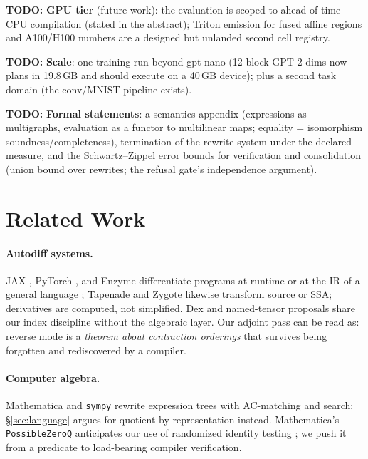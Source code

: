 \documentclass[sigplan,10pt,review]{acmart}
\newcommand{\todopaper}[1]{\par\noindent\colorbox{orange!25}{%
  \parbox{\dimexpr\linewidth-2\fboxsep}{\textbf{TODO:} #1}}\par}
\begin{document}
\todopaper{\textbf{GPU tier} (future work): the evaluation is scoped to
ahead-of-time CPU compilation (stated in the abstract); Triton emission
for fused affine regions and A100/H100 numbers are a designed but
unlanded second cell registry.}

\todopaper{\textbf{Scale}: one training run beyond gpt-nano (12-block
GPT-2 dims now plans in 19.8\,GB and should execute on a 40\,GB device);
plus a second task domain (the conv/MNIST pipeline exists).}


\todopaper{\textbf{Formal statements}: a semantics appendix (expressions
as multigraphs, evaluation as a functor to multilinear maps; equality =
isomorphism soundness/completeness), termination of the rewrite system
under the declared measure, and the Schwartz--Zippel error bounds for
verification and consolidation (union bound over rewrites; the refusal
gate's independence argument).}

\section{Related Work}\label{sec:related}

\paragraph{Autodiff systems.} JAX \cite{jax}, PyTorch \cite{pytorch}, and
Enzyme \cite{enzyme} differentiate programs at runtime or at the IR of a
general language \cite{griewank2008}; Tapenade \cite{tapenade} and Zygote
\cite{zygote} likewise transform source or SSA; derivatives are computed, not simplified. Dex \cite{dex} and named-tensor
proposals \cite{namedtensor,einops} share our index discipline without the
algebraic layer. Our adjoint pass can be read as: reverse mode is a
\emph{theorem about contraction orderings} that survives being forgotten
and rediscovered by a compiler.

\paragraph{Computer algebra.} Mathematica \cite{mathematica} and \texttt{sympy} \cite{sympy} rewrite
expression trees with AC-matching and search;
\S\ref{sec:language} argues for quotient-by-representation instead.
Mathematica's \texttt{PossibleZeroQ} anticipates our use of randomized
identity testing \cite{schwartz1980}; we push it from a predicate to load-bearing compiler
verification.
\end{document}
